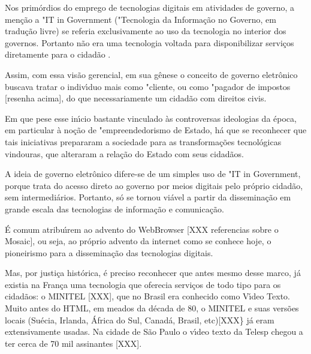 \documentclass[
12pt,		%
openright,	%
twoside,  %
a4paper,			%
chapter=TITLE,		%
english,			%
french,				%
spanish,			%
brazil				%
]{USPSC-classe/USPSC}
\begin{document}
Nos prim\'ordios do emprego de tecnologias digitais em atividades de governo, a men\c{c}\~ao a "IT in Government ("Tecnologia da Informa\c{c}\~ao no Governo, em tradu\c{c}\~ao livre) se referia exclusivamente ao uso da tecnologia no interior dos governos. Portanto n\~ao era uma tecnologia voltada para disponibilizar servi\c{c}os diretamente para o cidad\~ao .




Assim, com essa vis\~ao gerencial, em sua g\^enese o conceito de governo eletr\^onico buscava tratar o indiv\'{\i}duo mais como "cliente, ou como "pagador de impostos [resenha acima], do que necessariamente um cidad\~ao com direitos civis.




Em que pese esse in\'{\i}cio bastante vinculado \`as controversas ideologias da \'epoca, em particular \`a no\c{c}\~ao de "empreendedorismo de Estado, h\'a que se reconhecer que tais iniciativas prepararam a sociedade para as transforma\c{c}\~oes tecnol\'ogicas vindouras, que alteraram a rela\c{c}\~ao do Estado com seus cidad\~aos.




A ideia de governo eletr\^onico difere-se de um simples uso de "IT in Government, porque trata do acesso direto ao governo por meios digitais pelo pr\'oprio cidad\~ao, sem intermedi\'arios. Portanto, s\'o se tornou vi\'avel a partir da dissemina\c{c}\~ao em grande escala das tecnologias de informa\c{c}\~ao e comunica\c{c}\~ao.




\'E comum atribu\'{\i}rem ao advento do WebBrowser [XXX referencias sobre o Mosaic], ou seja, ao pr\'oprio advento da internet como se conhece hoje, o pioneirismo para a dissemina\c{c}\~ao das tecnologias digitais.




Mas, por justi\c{c}a hist\'orica, \'e preciso reconhecer que antes mesmo desse marco, j\'a existia na Fran\c{c}a uma tecnologia que oferecia servi\c{c}os de todo tipo para os cidad\~aos: o MINITEL [XXX], que no Brasil era conhecido como V\'{\i}deo Texto. Muito antes do HTML, em meados da d\'ecada de 80, o MINITEL e suas vers\~oes locais (Su\'ecia, Irlanda, \'Africa do Sul, Canad\'a, Brasil, etc)[XXX\} j\'a eram extensivamente usadas. Na cidade de S\~ao Paulo o v\'{\i}deo texto da Telesp chegou a ter cerca de 70 mil assinantes [XXX].
\end{document}
